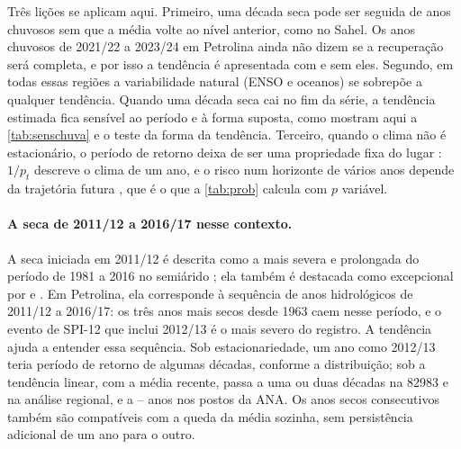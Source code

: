 \documentclass[11pt,a4paper]{article}
\newcommand{\Est}{82983}
\begin{document}
Três lições se aplicam aqui. Primeiro, uma década seca pode ser seguida de anos chuvosos sem que a
média volte ao nível anterior, como no Sahel. Os anos chuvosos de 2021/22 a 2023/24 em Petrolina ainda
não dizem se a recuperação será completa, e por isso a tendência é apresentada com e sem eles.
Segundo, em todas essas regiões a variabilidade natural (ENSO e oceanos) se sobrepõe a qualquer
tendência. Quando uma década seca cai no fim da série, a tendência estimada fica sensível ao período e
à forma suposta, como mostram aqui a \cref{tab:senschuva} e o teste da forma da tendência. Terceiro,
quando o clima não é estacionário, o período de retorno deixa de ser uma propriedade fixa do lugar
\parencite{milly2008}: $1/p_t$ descreve o clima de um ano, e o risco num horizonte de vários anos
depende da trajetória futura \parencite{salas2014}, que é o que a \cref{tab:prob} calcula com $p$
variável.

\paragraph{A seca de 2011/12 a 2016/17 nesse contexto.} A seca iniciada em 2011/12 é descrita
como a mais severa e prolongada do período de 1981 a 2016 no semiárido \parencite{brito2018}; ela
também é destacada como excepcional por \textcite{marengo2017} e \textcite{cunha2019}. Em Petrolina, ela
corresponde à sequência de anos hidrológicos de 2011/12 a 2016/17: os três anos mais secos desde 1963
caem nesse período, e o evento de SPI-12 que inclui 2012/13 é o mais severo do registro. A tendência
ajuda a entender essa sequência. Sob estacionariedade, um ano como 2012/13 teria período de retorno de
algumas décadas, conforme a distribuição; sob a tendência linear, com a média recente, passa a uma ou
duas décadas na \Est{} e na análise regional, e a \TNSAnaMin{}--\TNSAnaMax{} anos nos postos da ANA. Os anos secos
consecutivos também são compatíveis com a queda da média sozinha, sem persistência adicional de um ano
para o outro.
\end{document}
